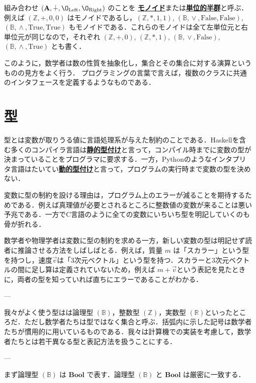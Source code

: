 \documentclass[a4paper,twocolumn]{jsbook}
\newcommand{\programminglanguage}[1]{\textsf{#1}}
\newcommand{\clang}{\programminglanguage{C}}
\newcommand{\haskell}{\programminglanguage{Haskell}}
\newcommand{\python}{\programminglanguage{Python}}
\newcommand{\keyword}[1]{{\underline{\textbf{#1}}}}
\newcommand{\mSpecialConst}[1]{\mathrm{#1}} %
\newcommand{\mFalse}{\mSpecialConst{False}}
\newcommand{\mTrue}{\mSpecialConst{True}}
\newcommand{\mZero}{\O}
\DeclareMathOperator{\mLogicalAnd}{\wedge}
\DeclareMathOperator{\mLogicalOr}{\vee}
\DeclareMathOperator{\mPlus}{\dotplus}
\newcommand{\mSpecialSub}[1]{\text{#1}}
\newcommand{\mLeft}{\mSpecialSub{Left}}
\newcommand{\mRight}{\mSpecialSub{Right}}
\newcommand{\mSet}[1]{\mathbf{#1}}
\newcommand{\mSpecialSet}[1]{\mathbb{#1}} %
\newcommand{\mBSet}{\mSpecialSet{B}}
\newcommand{\mRSet}{\mSpecialSet{R}}
\newcommand{\mZSet}{\mSpecialSet{Z}}
\newcommand{\mType}[1]{\mathbf{#1}}
\newcommand{\mTupleWith}[1]{\left(#1\right)}
\newcommand{\mBoolType}{\mType{Bool}}
\newcommand{\mVec}[1]{\Vec{#1}}
\begin{document}
組み合わせ $\mTupleWith{\mSet{A},\mPlus,\mZero_\mLeft,\mZero_\mRight}$ のことを
\keyword{モノイド}または\keyword{単位的半群}と呼ぶ．例えば $\mTupleWith{\mZSet,+,0,0}$ はモノイドであるし，$\mTupleWith{\mZSet,*,1,1}$, $\mTupleWith{\mBSet,\mLogicalOr,\mFalse,\mFalse}$, $\mTupleWith{\mBSet,\mLogicalAnd,\mTrue,\mTrue}$ もモノイドである．これらのモノイドは全て左単位元と右単位元が同じなので，それぞれ $\mTupleWith{\mZSet,+,0}$, $\mTupleWith{\mZSet,*,1}$, $\mTupleWith{\mBSet,\mLogicalOr,\mFalse}$, $\mTupleWith{\mBSet,\mLogicalAnd,\mTrue}$ とも書く．

このように，数学者は数の性質を抽象化し，集合とその集合に対する演算というものの見方をよく行う．
プログラミングの言葉で言えば，複数のクラスに共通のインタフェースを定義するようなものである．

\section{型}

型とは変数が取りうる値に言語処理系が与えた制約のことである．\haskell を含む多くのコンパイラ言語は\keyword{静的型付け}と言って，コンパイル時までに変数の型が決まっていることをプログラマに要求する．一方，\python のようなインタプリタ言語はたいてい\keyword{動的型付け}と言って，プログラムの実行時まで変数の型を決めない．

変数に型の制約を設ける理由は，プログラム上のエラーが減ることを期待するためである．例えば真理値が必要とされるところに整数値の変数が来ることは悪い予兆である．一方で\clang 言語のように全ての変数にいちいち型を明記していくのも骨が折れる．

数学者や物理学者は変数に型の制約を求める一方，新しい変数の型は明記せず読者に推論させる方法をしばしばとる．例えば，質量 $m$ は「スカラー」という型を持つし，速度$\mVec{v}$は「3次元ベクトル」という型を持つ．スカラーと3次元ベクトルの間に足し算は定義されていないため，例えば $m+\mVec{v}$という表記を見たときに，両者の型を知っていれば直ちにエラーであることがわかる．

---

我々がよく使う型はは論理型 $(\mBSet)$，整数型 $(\mZSet)$，実数型 $(\mRSet)$といったところだ．ただし数学者たちは型ではなく集合と呼ぶ．括弧内に示した記号は数学者たちが慣用的に用いているものである．我々は計算機での実装を考慮して，数学者たちとは若干異なる型と表記方法を扱うことにする．

---

まず論理型 $(\mBSet)$ は $\mBoolType$ で表す．論理型 $(\mBSet)$ と $\mBoolType$ は厳密に一致する．
\end{document}
